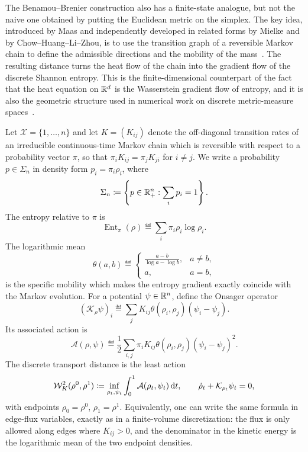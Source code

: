 The Benamou--Brenier construction also has a finite-state analogue, but not the naive one obtained by putting the Euclidean metric on the simplex. The key idea, introduced by Maas and independently developed in related forms by Mielke and by Chow--Huang--Li--Zhou, is to use the transition graph of a reversible Markov chain to define the admissible directions and the mobility of the mass~\cite{Maas2011,MielkeCVPDE,ChowHuangLiZhou2012}. The resulting distance turns the heat flow of the chain into the gradient flow of the discrete Shannon entropy. This is the finite-dimensional counterpart of the fact that the heat equation on \(\mathbb{R}^d\) is the Wasserstein gradient flow of entropy, and it is also the geometric structure used in numerical work on discrete metric-measure spaces~\cite{ErbarDCDS,erbar2017computation}.

Let \(\mathcal X=\{1,\ldots,n\}\) and let \(K=(K_{ij})\) denote the off-diagonal transition rates of an irreducible continuous-time Markov chain which is reversible with respect to a probability vector \(\pi\), so that \(\pi_iK_{ij}=\pi_jK_{ji}\) for \(i\neq j\). We write a probability \(p\in\Sigma_n\) in density form \(p_i=\pi_i\rho_i\), where
\[
\Sigma_n\coloneqq\left\{p\in\mathbb{R}_+^n:\sum_i p_i=1\right\}.
\]
The entropy relative to \(\pi\) is
\[
\operatorname{Ent}_\pi(\rho)\eqdef\sum_i\pi_i\rho_i\log\rho_i.
\]
The logarithmic mean
\[
\theta(a,b)\eqdef
\begin{cases}
\displaystyle\frac{a-b}{\log a-\log b}, & a\neq b,\\[.4em]
a, & a=b,
\end{cases}
\]
is the specific mobility which makes the entropy gradient exactly coincide with the Markov evolution. For a potential \(\psi\in\mathbb{R}^n\), define the Onsager operator
\begin{equation}
\label{eq-discrete-markov-onsager}
(\mathcal K_\rho\psi)_i
\eqdef
\sum_j K_{ij}\theta(\rho_i,\rho_j)(\psi_i-\psi_j).
\end{equation}
Its associated action is
\begin{equation}
\label{eq-discrete-markov-action}
\mathcal A(\rho,\psi)
\eqdef
\frac12\sum_{i,j}\pi_iK_{ij}\theta(\rho_i,\rho_j)(\psi_i-\psi_j)^2.
\end{equation}
The discrete transport distance is the least action
\begin{equation}
\label{eq-discrete-markov-distance}
\mathcal W_K^2(\rho^0,\rho^1)
\coloneqq
\inf_{\rho_t,\psi_t}
\int_0^1\mathcal A(\rho_t,\psi_t)\,\mathrm{d} t,
\qquad
\dot\rho_t+\mathcal K_{\rho_t}\psi_t=0,
\end{equation}
with endpoints \(\rho_0=\rho^0\), \(\rho_1=\rho^1\). Equivalently, one can write the same formula in edge-flux variables, exactly as in a finite-volume discretization: the flux is only allowed along edges where \(K_{ij}>0\), and the denominator in the kinetic energy is the logarithmic mean of the two endpoint densities.

